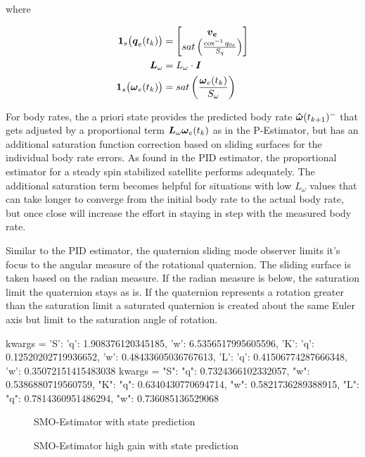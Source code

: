 where

\begin{subequations}
  \begin{align}
    \boldsymbol{1}_s\big(\boldsymbol{q}_{e}(t_k) \big) &= \begin{bmatrix} \boldsymbol{v_e} \\ sat\left( \frac{\cos^{-1} q_{0e} }{S_{q}} \right) \end{bmatrix} \\
    \boldsymbol{L}_{\omega} &= L_\omega \cdot \boldsymbol{I} \\
    \boldsymbol{1}_s \big(\boldsymbol{\omega}_e(t_{k}) \big) &= sat\left( \frac{\boldsymbol{\omega}_e(t_{k})}{S_{\omega}} \right)
  \end{align}
\end{subequations}

For body rates, the a priori state provides the predicted body rate $\boldsymbol{\hat{\omega}}(t_{k+1})^-$ that gets adjusted by a proportional term $\boldsymbol{L}_{\omega} \boldsymbol{\omega}_e(t_{k})$ as in the P-Estimator, but has an additional saturation function correction based on sliding surfaces for the individual body rate errors.  As found in the PID estimator, the proportional estimator for a steady spin stabilized satellite performs adequately.  The additional saturation term becomes helpful for situations with low $L_\omega$ values that can take longer to converge from the initial body rate to the actual body rate, but once close will increase the effort in staying in step with the measured body rate.

Similar to the PID estimator, the quaternion sliding mode observer limits it's focus to the angular measure of the rotational quaternion.  The sliding surface is taken based on the radian measure.  If the radian measure is below, the saturation limit the quaternion stays as is.  If the quaternion represents a rotation greater than the saturation limit a saturated quaternion is created about the same Euler axis but limit to the saturation angle of rotation.

kwargs = {'S': {'q': 1.908376120345185, 'w': 6.5356517995605596}, 'K': {'q': 0.12520202719936652, 'w': 0.48433605036767613}, 'L': {'q': 0.41506774287666348, 'w': 0.35072151415483038}}
kwargs = {"S": {"q": 0.7324366102332057, "w": 0.5386880719560759}, "K": {"q": 0.6340430770694714, "w": 0.5821736289388915},  "L": {"q": 0.7814360951486294, "w": 0.736085136529068}}

\begin{figure}[H]
  \centerline{}
  \caption{SMO-Estimator with state prediction}
  \label{fig:SMOEstimatorwithstateprediction}
\end{figure}
\begin{figure}[H]
  \centerline{}
  \caption{SMO-Estimator high gain with state prediction}
  \label{fig:SMOEstimatorhighgainwithstateprediction}
\end{figure}



